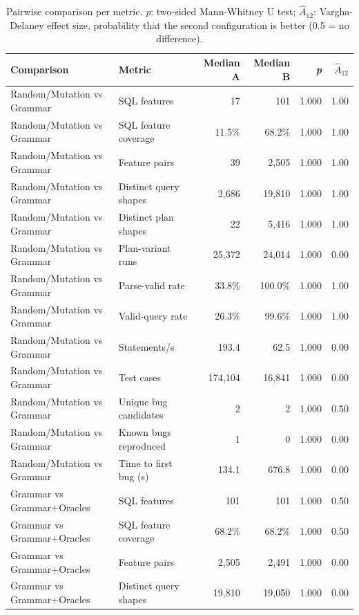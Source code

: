 \begin{table}[t]
  \caption{Pairwise comparison per metric. \emph{p}: two-sided Mann-Whitney U test; \emph{$\hat{A}_{12}$}: Vargha-Delaney effect size, probability that the second configuration is better (0.5 = no difference).}
  \label{tab:rq3-smoke2-comparison}
  \footnotesize
  \begin{tabular}{llrrrr}
    \toprule
    Comparison & Metric & Median A & Median B & \emph{p} & $\hat{A}_{12}$ \\
    \midrule
    Random/Mutation vs Grammar & SQL features & 17 & 101 & 1.000 & 1.00 \\
    Random/Mutation vs Grammar & SQL feature coverage & 11.5\% & 68.2\% & 1.000 & 1.00 \\
    Random/Mutation vs Grammar & Feature pairs & 39 & 2{,}505 & 1.000 & 1.00 \\
    Random/Mutation vs Grammar & Distinct query shapes & 2{,}686 & 19{,}810 & 1.000 & 1.00 \\
    Random/Mutation vs Grammar & Distinct plan shapes & 22 & 5{,}416 & 1.000 & 1.00 \\
    Random/Mutation vs Grammar & Plan-variant runs & 25{,}372 & 24{,}014 & 1.000 & 0.00 \\
    Random/Mutation vs Grammar & Parse-valid rate & 33.8\% & 100.0\% & 1.000 & 1.00 \\
    Random/Mutation vs Grammar & Valid-query rate & 26.3\% & 99.6\% & 1.000 & 1.00 \\
    Random/Mutation vs Grammar & Statements/s & 193.4 & 62.5 & 1.000 & 0.00 \\
    Random/Mutation vs Grammar & Test cases & 174{,}104 & 16{,}841 & 1.000 & 0.00 \\
    Random/Mutation vs Grammar & Unique bug candidates & 2 & 2 & 1.000 & 0.50 \\
    Random/Mutation vs Grammar & Known bugs reproduced & 1 & 0 & 1.000 & 0.00 \\
    Random/Mutation vs Grammar & Time to first bug (s) & 134.1 & 676.8 & 1.000 & 0.00 \\
    Grammar vs Grammar+Oracles & SQL features & 101 & 101 & 1.000 & 0.50 \\
    Grammar vs Grammar+Oracles & SQL feature coverage & 68.2\% & 68.2\% & 1.000 & 0.50 \\
    Grammar vs Grammar+Oracles & Feature pairs & 2{,}505 & 2{,}491 & 1.000 & 0.00 \\
    Grammar vs Grammar+Oracles & Distinct query shapes & 19{,}810 & 19{,}050 & 1.000 & 0.00 \\

\end{tabular}
\end{table}
